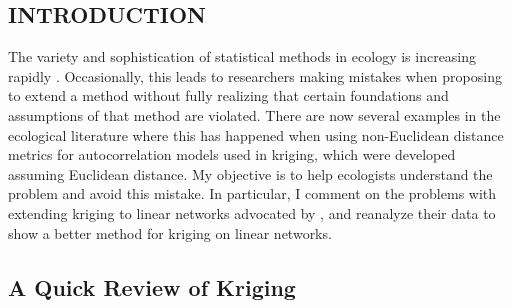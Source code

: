 \documentclass[11pt, titlepage]{article}\usepackage[]{graphicx}\usepackage[]{color}
\begin{document}

\newpage
\begin{spacing}{1.9}
\begin{flushleft}
\setlength{\parindent}{1cm}



\section*{INTRODUCTION}

The variety and sophistication of statistical methods in ecology is increasing rapidly \citep{Touc:McCo:mism:2016}. Occasionally, this leads to researchers making mistakes when proposing to extend a method without fully realizing that certain foundations and assumptions of that method are violated. There are now several examples in the ecological literature where this has happened when using non-Euclidean distance metrics for autocorrelation models used in kriging, which were developed assuming Euclidean distance. My objective is to help ecologists understand the problem and avoid this mistake.  In particular, I comment on the problems with extending kriging to linear networks advocated by \citet{Ladl:Avga:Whea:Boyc:pred:2016}, and reanalyze their data to show a better method for kriging on linear networks.

\subsection*{A Quick Review of Kriging}


\end{flushleft}
\end{spacing}
\end{document}
